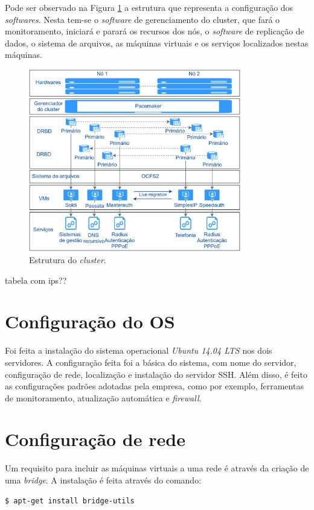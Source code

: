 Pode ser observado na Figura \ref{fig:projeto_estrutura} a estrutura que representa a configuração dos \textit{softwares}. Nesta tem-se o 
\textit{software} de gerenciamento do cluster, que fará o monitoramento, iniciará e parará os recursos dos nós, o \textit{software} de replicação 
de dados, o sistema de arquivos, as máquinas virtuais e os serviços localizados nestas máquinas.

\begin{figure}[h!]
 \centering
 \includegraphics[width=350px]{img/projeto_estrutura.eps}
 \caption{Estrutura do \textit{cluster}.}
 \label{fig:projeto_estrutura}
\end{figure}

tabela com ips??

\section{Configuração do \ac{OS}}

Foi feita a instalação do sistema operacional \textit{Ubuntu 14.04 \ac{LTS}} nos dois servidores. A configuração feita foi a básica do sistema,
com nome do servidor, configuração de rede, localização e instalação do servidor \ac{SSH}.
Além disso, é feito as configurações padrões adotadas pela empresa, como por exemplo, ferramentas de monitoramento, atualização automática
e \textit{firewall}.

\section{Configuração de rede}

Um requisito para incluir as máquinas virtuais a uma rede é através da criação de uma \textit{bridge}. A instalação é feita através do comando:
\begin{lstlisting}[language=bash]
  $ apt-get install bridge-utils
\end{lstlisting}

